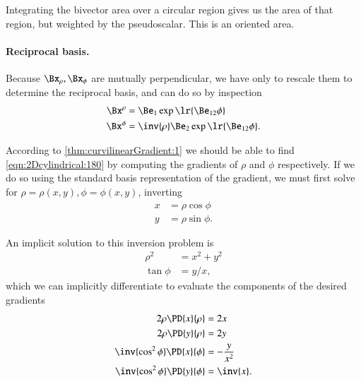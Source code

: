 Integrating the bivector area over a circular region gives us the area of that region, but weighted by the  pseudoscalar.  This is an oriented area.

\paragraph{Reciprocal basis.}
Because \( \Bx_\rho, \Bx_\phi \) are mutually perpendicular, we have only to rescale them to determine the reciprocal basis, and can do so by inspection
\begin{dmath}\label{eqn:2Dcylindrical:180}
\begin{aligned}
\Bx^\rho &= \Be_1 \exp\lr{ \Be_{12} \phi } \\
\Bx^\phi &= \inv{\rho} \Be_2 \exp\lr{ \Be_{12} \phi }.
\end{aligned}
\end{dmath}

According to \cref{thm:curvilinearGradient:1}
we should be able to find \cref{eqn:2Dcylindrical:180} by computing the gradients of \( \rho \) and \( \phi \) respectively.
If we do so using the  standard basis representation of the gradient, we must first solve for \( \rho = \rho(x,y), \phi = \phi(x,y) \), inverting
\begin{dmath}\label{eqn:2Dcylindrical:620}
\begin{aligned}
x &= \rho \cos\phi \\
y &= \rho \sin\phi.
\end{aligned}
\end{dmath}

An implicit solution to this inversion problem is
\begin{dmath}\label{eqn:2Dcylindrical:500}
\begin{aligned}
\rho^2 &= x^2 + y^2 \\
\tan\phi &= y/x,
\end{aligned}
\end{dmath}
which we can implicitly differentiate to evaluate the components of the desired gradients
\begin{dmath}\label{eqn:2Dcylindrical:520}
\begin{aligned}
2 \rho \PD{x}{\rho} &= 2 x \\
2 \rho \PD{y}{\rho} &= 2 y \\
\inv{\cos^2\phi} \PD{x}{\phi} &= -\frac{y}{x^2} \\
\inv{\cos^2\phi} \PD{y}{\phi} &= \inv{x}.
\end{aligned}
\end{dmath}

